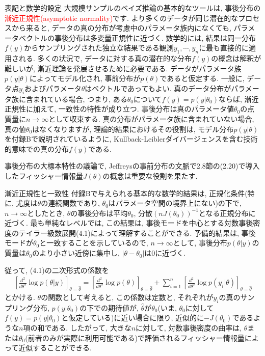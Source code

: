 \documentclass[10pt,dvipdfmx,a4]{beamer}
\newcommand{\eqn}[1]{\begin{align*}#1\end{align*}}
\newcommand{\tcr}[1]{\textcolor{red}{#1}}
\begin{document}

\begin{frame}{表記と数学的設定}
大規模サンプルのベイズ推論の基本的なツールは, 事後分布の\tcr{漸近正規性(asymptotic normality)}です.
より多くのデータが同じ潜在的なプロセスから来ると, データの真の分布が考慮中のパラメータ族内になくても, パラメータベクトルの事後分布は多変量正規性に近づく.
数学的には, 結果は同一分布$f(y)$からサンプリングされた独立な結果である観測$y_1,\cdots,y_n$に最も直接的に適用される.
多くの状況で, データに対する真の潜在的な分布$f(y)$の概念は解釈が難しいが, 漸近理論を発展させるために必要である.
データがパラメータ族$p(y|\theta)$によってモデル化され, 事前分布が$p(\theta)$であると仮定する.
一般に, データ点$y_i$およびパラメータ$\theta$はベクトルであってもよい.
真のデータ分布がパラメータ族に含まれている場合, つまり, ある$\theta_0$について$f(y)=p(y|\theta_0)$ならば, 漸近正規性に加えて, 一致性の特性が成り立つ.
事後分布は真のパラメータ値$\theta_0$の点質量に$n\rightarrow \infty$として収束する.
真の分布がパラメータ族に含まれていない場合, 真の値$\theta_0$はなくなりますが, 理論的結果におけるその役割は, モデル分布$p(y|\theta)$を付録Bで説明されているように, Kullback-Leiblerダイバージェンスを含む技術的意味での真の分布$f(y)$である.

事後分布の大標本特性の議論で, Jeffreysの事前分布の文脈で2.8節の(2.20)で導入したフィッシャー情報量$J(\theta)$の概念は重要な役割を果たす.
\end{frame}


\begin{frame}{漸近正規性と一致性}
付録Bで与えられる基本的な数学的結果は, 正規化条件(特に, 尤度は$\theta$の連続関数であり, $\theta_0$はパラメータ空間の境界上にない)の下で, $n\rightarrow\infty$としたとき, $\theta$の事後分布は平均$\theta_0$, 分散$(nJ(\theta_0))^{-1}$となる正規分布に近づく.
最も単純なレベルでは, この結果は, 事後モードを中心とする対数事後密度のテイラー級数展開(4.1)によって理解することができる.
予備的結果は, 事後モードが$\theta_0$と一致することを示しているので, $n\rightarrow \infty$として, 事後分布$p(\theta|y)$の質量は$\theta_0$のより小さい近傍に集中し, $|\theta-\theta_0|$は0に近づく.

従って, (4.1)の二次形式の係数を
\eqn{\left[\frac{d^2}{d\theta^2}\log p(\theta|y)\right]_{\theta=\hat{\theta}}=
\left[\frac{d^2}{d\theta^2}\log p(\theta)\right]_{\theta=\hat{\theta}}+
\sum_{i=1}^n\left[\frac{d^2}{d\theta^2}\log p(y_i|\theta)\right]_{\theta=\hat{\theta}}}
とかける.
$\theta$の関数として考えると, この係数は定数と, それぞれが$y_i$の真のサンプリング分布, $p(y|\theta_0)$の下での期待値が, $\hat{\theta}$が$\theta_0$(いま, $\theta_0$に対して$f(y)=p(y|\theta_0)$と仮定している)に近い場合に限り, 近似的に$-J(\theta_0)$であるような$n$項の和である.
したがって, 大きな$n$に対して, 対数事後密度の曲率は, $\theta$または$\theta_0$(前者のみが実際に利用可能である)で評価されるフィッシャー情報量によって近似することができる.
\end{frame}
\end{document}
